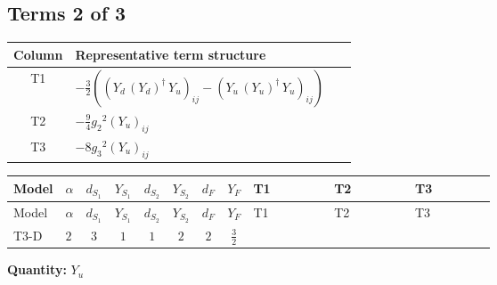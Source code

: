\documentclass[8pt]{article}
\begin{document}
\begin{landscape}
\subsection*{Terms 2 of 3}
\begin{center}
\begin{tabular}{@{}c >{\raggedright\arraybackslash}p{0.82\linewidth}@{}}
\toprule
Column & Representative term structure \\
\midrule
T1 & \(\displaystyle -\frac{3}{2} (\left({Y_d}\,\left({Y_d}\right)^{\dagger}\,{Y_u}\right)_{ij}-\left({Y_u}\,\left({Y_u}\right)^{\dagger}\,{Y_u}\right)_{ij})\) \\
\midrule
T2 & \(\displaystyle -\frac{9}{4} {g_2}^2 \left({Y_u}\right)_{ij}\) \\
\midrule
T3 & \(\displaystyle -8 {g_3}^2 \left({Y_u}\right)_{ij}\) \\
\midrule
\bottomrule
\end{tabular}
\end{center}
\smallskip
\tiny
\begin{longtable}{@{}llcccccc >{\raggedright\arraybackslash}p{0.21\linewidth} >{\raggedright\arraybackslash}p{0.21\linewidth} >{\raggedright\arraybackslash}p{0.21\linewidth}@{}}
\toprule
Model & $\alpha$ & $d_{S_1}$ & $Y_{S_1}$ & $d_{S_2}$ & $Y_{S_2}$ & $d_F$ & $Y_F$ & T1 & T2 & T3 \\
\midrule
\endfirsthead
\toprule
Model & $\alpha$ & $d_{S_1}$ & $Y_{S_1}$ & $d_{S_2}$ & $Y_{S_2}$ & $d_F$ & $Y_F$ & T1 & T2 & T3 \\
\midrule
\endhead
T3-D & $2$ & $3$ & $1$ & $1$ & $2$ & $2$ & $\frac{3}{2}$ & \scriptsize\adjustbox{max width=\linewidth}{$\begin{gathered} -\frac{3}{2} (\left({Y_d}\,\left({Y_d}\right)^{\dagger}\,{Y_u}\right)_{ij}-\left({Y_u}\,\left({Y_u}\right)^{\dagger}\,{Y_u}\right)_{ij})\end{gathered}$} & \scriptsize\adjustbox{max width=\linewidth}{$\begin{gathered} -\frac{9}{4} {g_2}^2 \left({Y_u}\right)_{ij}\end{gathered}$} & \scriptsize\adjustbox{max width=\linewidth}{$\begin{gathered} -8 {g_3}^2 \left({Y_u}\right)_{ij}\end{gathered}$} \\
\midrule
\bottomrule
\end{longtable}
\clearpage
\noindent\textbf{Quantity: }$Y_u$\par\smallskip

\end{landscape}
\end{document}
